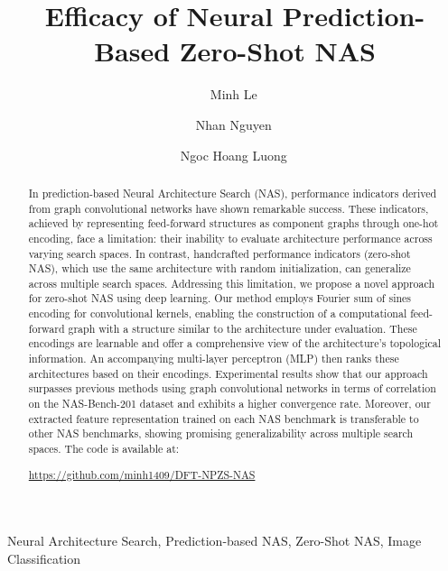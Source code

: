\documentclass[lettersize,journal]{IEEEtran}
\begin{document}
\title{Efficacy of Neural Prediction-Based Zero-Shot NAS}

\author{Minh Le\,     
    \and
    Nhan Nguyen\,
    \and
    Ngoc Hoang Luong\,}




\maketitle

\begin{abstract}
In prediction-based Neural Architecture Search (NAS), performance indicators derived from graph convolutional networks have shown remarkable success. These indicators, achieved by representing feed-forward structures as component graphs through one-hot encoding, face a limitation: their inability to evaluate architecture performance across varying search spaces. In contrast, handcrafted performance indicators (zero-shot NAS), which use the same architecture with random initialization, can generalize across multiple search spaces. Addressing this limitation, we propose a novel approach for zero-shot NAS using deep learning. Our method employs Fourier sum of sines encoding for convolutional kernels, enabling the construction of a computational feed-forward graph with a structure similar to the architecture under evaluation. These encodings are learnable and offer a comprehensive view of the architecture's topological information. An accompanying multi-layer perceptron (MLP) then ranks these architectures based on their encodings. Experimental results show that our approach surpasses previous methods using graph convolutional networks in terms of correlation on the NAS-Bench-201 dataset and exhibits a higher convergence rate. Moreover, our extracted feature representation trained on each NAS benchmark is transferable to other NAS benchmarks, showing promising generalizability across multiple search spaces. The code is available at: 

\url{https://github.com/minh1409/DFT-NPZS-NAS}
\end{abstract}

\begin{IEEEkeywords}
Neural Architecture Search, Prediction-based NAS, Zero-Shot NAS, Image Classification
\end{IEEEkeywords}






\IEEEpeerreviewmaketitle
\end{document}
